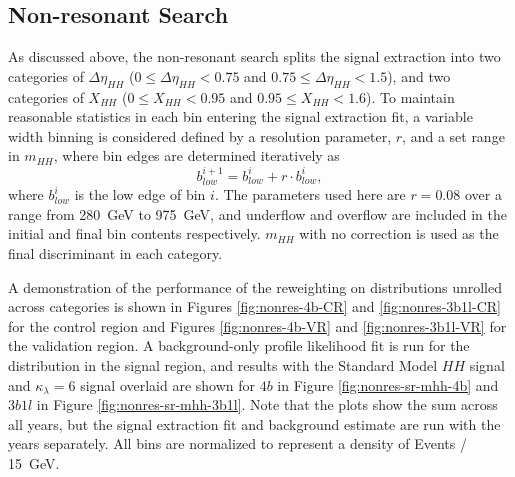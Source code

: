 \FloatBarrier
\subsection{Non-resonant Search}
As discussed above, the non-resonant search splits the signal extraction into two categories of 
$\Delta\eta_{HH}$ ($0 \leq \Delta\eta_{HH} < 0.75$ and $0.75 \leq \Delta\eta_{HH} < 1.5$), 
and two categories of $X_{HH}$ ($0 \leq X_{HH} < 0.95$ and $0.95 \leq X_{HH} < 1.6$). 
To maintain reasonable statistics in each bin entering the signal extraction fit, a 
variable width binning is considered defined by a resolution parameter, $r$, and a set range in 
$m_{HH}$, where bin edges are determined iteratively as
\begin{equation}
b_{low}^{i+1} = b_{low}^{i} + r\cdot b_{low}^{i},
\end{equation}
where $b_{low}^{i}$ is the low edge of bin $i$. The parameters used here are 
$r=0.08$ over a range from \SI{280}{\GeV} to \SI{975}{\GeV}, and underflow and 
overflow are included in the initial and final bin contents respectively. $m_{HH}$ with 
no correction is used as the final discriminant in each category.

A demonstration of the performance of the reweighting on distributions unrolled across categories is shown 
in Figures \ref{fig:nonres-4b-CR} and \ref{fig:nonres-3b1l-CR} for the control region and 
Figures \ref{fig:nonres-4b-VR} and \ref{fig:nonres-3b1l-VR} for 
the validation region. A background-only profile likelihood fit is run for the distribution in the signal 
region, and results with the Standard Model $HH$ signal and $\kappa_{\lambda}=6$ signal overlaid are shown for $4b$ in Figure \ref{fig:nonres-sr-mhh-4b} and $3b1l$ in Figure \ref{fig:nonres-sr-mhh-3b1l}. Note that 
the plots show the sum across all years, but the signal extraction fit and background estimate are run with the 
years separately. All bins are normalized to represent a density of Events / \SI{15}{\GeV}.

